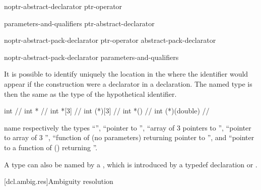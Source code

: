 \begin{bnf}
\br
    noptr-abstract-declarator\br
    ptr-operator 
\end{bnf}

\begin{bnf}
\br
     parameters-and-qualifiers\br
     \terminal{[}  \terminal{]} \br
    \terminal{(} ptr-abstract-declarator \terminal{)}
\end{bnf}

\begin{bnf}
\br
    noptr-abstract-pack-declarator\br
    ptr-operator abstract-pack-declarator
\end{bnf}

\begin{bnf}
\br
    noptr-abstract-pack-declarator parameters-and-qualifiers\br
\end{bnf}

It is possible to identify uniquely the location in the
where the identifier would appear if the construction were a declarator
in a declaration.
The named type is then the same as the type of the
hypothetical identifier.
\begin{example}
\begin{codeblock}
int                 // 
int *               // 
int *[3]            // 
int (*)[3]          // 
int *()             // 
int (*)(double)     // 
\end{codeblock}
name respectively the types
``'',
``pointer to
'',
``array of 3 pointers to
'',
``pointer to array of 3
'',
``function of (no parameters) returning pointer to
'',
and ``pointer to a function of
()
returning
''.
\end{example}

\pnum
\begin{note}
A type can also be named by a ,
which is introduced by a typedef declaration
or .
\end{note}

[dcl.ambig.res]{Ambiguity resolution}%
%


